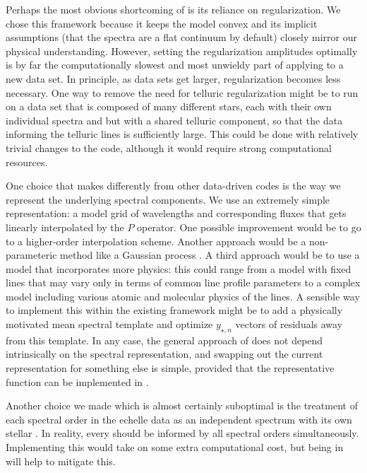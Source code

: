 \documentclass[modern]{aastex62}
\begin{document}
Perhaps the most obvious shortcoming of \wobble is its reliance on regularization. 
We chose this framework because it keeps the model convex and its implicit assumptions (that the spectra are a flat continuum by default) closely mirror our physical understanding. 
However, setting the regularization amplitudes optimally is by far the computationally slowest and most unwieldy part of applying \wobble to a new data set. 
In principle, as data sets get larger, regularization becomes less necessary. 
One way to remove the need for telluric regularization might be to run on a data set that is composed of many different stars, each with their own individual spectra and \RVs but with a shared telluric component, so that the data informing the telluric lines is sufficiently large. 
This could be done with relatively trivial changes to the \wobble code, although it would require strong computational resources.

One choice that \wobble makes differently from other data-driven \RV codes is the way we represent the underlying spectral components. 
We use an extremely simple representation: a model grid of wavelengths and corresponding fluxes that gets linearly interpolated by the $P$ operator. 
One possible improvement would be to go to a higher-order interpolation scheme. 
Another approach would be a non-parameteric method like a Gaussian process \citep[as in][]{Czekala2017}. 
A third approach would be to use a model that incorporates more physics: this could range from a model with fixed lines that may vary only in terms of common line profile parameters to a complex model including various atomic and molecular physics of the lines. 
A sensible way to implement this within the existing \wobble framework might be to add a physically motivated mean spectral template and optimize $y_{\star, n}$ vectors of residuals away from this template. 
In any case, the general approach of \wobble does not depend intrinsically on the spectral representation, and swapping out the current representation for something else is simple, provided that the representative function can be implemented in \TF.

Another choice we made which is almost certainly suboptimal is the treatment of each spectral order in the echelle data as an independent spectrum with its own stellar \RV. 
In reality, every \RV should be informed by all spectral orders simultaneously. 
Implementing this would take on some extra computational cost, but being in \TF will help to mitigate this.
\end{document}
